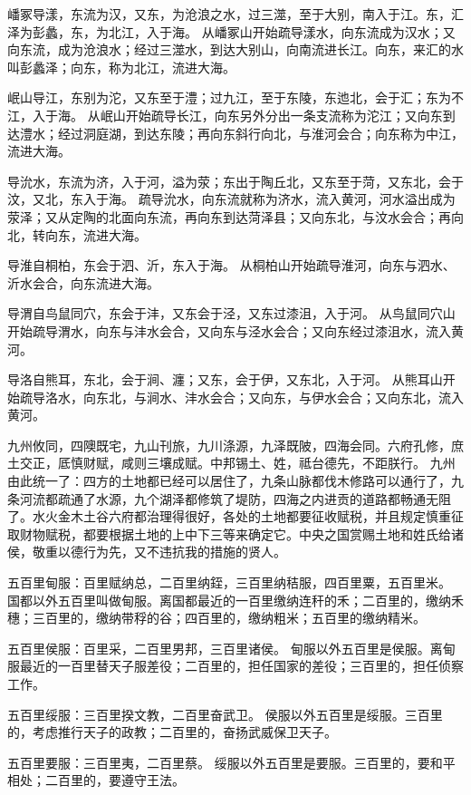 \documentclass[a4paper,12pt,UTF8,twoside]{ctexbook}
\begin{document}
嶓冢导漾，东流为汉，又东，为沧浪之水，过三澨，至于大别，南入于江。东，汇泽为彭蠡，东，为北江，入于海。
从嶓冢山开始疏导漾水，向东流成为汉水；又向东流，成为沧浪水；经过三澨水，到达大别山，向南流进长江。向东，来汇的水叫彭蠡泽；向东，称为北江，流进大海。

岷山导江，东别为沱，又东至于澧；过九江，至于东陵，东迆北，会于汇；东为不江，入于海。
从岷山开始疏导长江，向东另外分出一条支流称为沱江；又向东到达澧水；经过洞庭湖，到达东陵；再向东斜行向北，与淮河会合；向东称为中江，流进大海。

导沇水，东流为济，入于河，溢为荥；东出于陶丘北，又东至于菏，又东北，会于汶，又北，东入于海。
疏导沇水，向东流就称为济水，流入黄河，河水溢出成为荥泽；又从定陶的北面向东流，再向东到达菏泽县；又向东北，与汶水会合；再向北，转向东，流进大海。

导淮自桐柏，东会于泗、沂，东入于海。
从桐柏山开始疏导淮河，向东与泗水、沂水会合，向东流进大海。

导渭自鸟鼠同穴，东会于沣，又东会于泾，又东过漆沮，入于河。
从鸟鼠同穴山开始疏导渭水，向东与沣水会合，又向东与泾水会合；又向东经过漆沮水，流入黄河。

导洛自熊耳，东北，会于涧、瀍；又东，会于伊，又东北，入于河。
从熊耳山开始疏导洛水，向东北，与涧水、沣水会合；又向东，与伊水会合；又向东北，流入黄河。

九州攸同，四隩既宅，九山刊旅，九川涤源，九泽既陂，四海会同。六府孔修，庶土交正，厎慎财赋，咸则三壤成赋。中邦锡土、姓，祗台德先，不距朕行。
九州由此统一了：四方的土地都已经可以居住了，九条山脉都伐木修路可以通行了，九条河流都疏通了水源，九个湖泽都修筑了堤防，四海之内进贡的道路都畅通无阻了。水火金木土谷六府都治理得很好，各处的土地都要征收赋税，并且规定慎重征取财物赋税，都要根据土地的上中下三等来确定它。中央之国赏赐土地和姓氏给诸侯，敬重以德行为先，又不违抗我的措施的贤人。

五百里甸服：百里赋纳总，二百里纳銍，三百里纳秸服，四百里粟，五百里米。
国都以外五百里叫做甸服。离国都最近的一百里缴纳连秆的禾；二百里的，缴纳禾穗；三百里的，缴纳带稃的谷；四百里的，缴纳粗米；五百里的缴纳精米。

五百里侯服：百里采，二百里男邦，三百里诸侯。
甸服以外五百里是侯服。离甸服最近的一百里替天子服差役；二百里的，担任国家的差役；三百里的，担任侦察工作。

五百里绥服：三百里揆文教，二百里奋武卫。
侯服以外五百里是绥服。三百里的，考虑推行天子的政教；二百里的，奋扬武威保卫天子。

五百里要服：三百里夷，二百里蔡。
绥服以外五百里是要服。三百里的，要和平相处；二百里的，要遵守王法。
\end{document}
